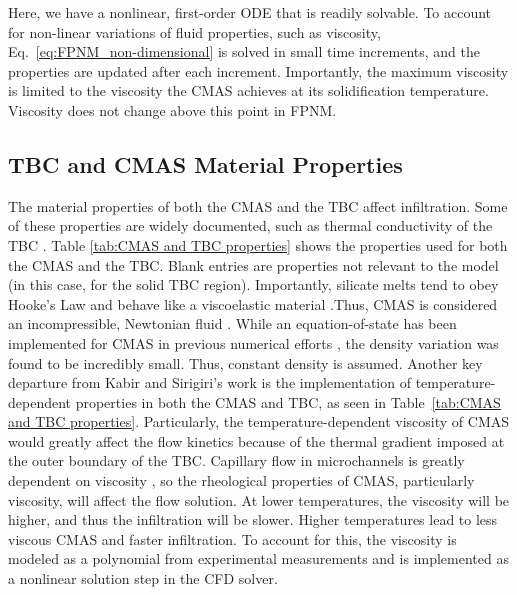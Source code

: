 \documentclass[%
 aip,
 amsmath,amssymb,
 reprint,%
floatfix]{revtex4-1}
\begin{document}
\noindent Here, we have a nonlinear, first-order ODE that is readily solvable. To account for non-linear variations of fluid properties, such as viscosity, Eq.~\ref{eq:FPNM_non-dimensional} is solved in small time increments, and the properties are updated after each increment. Importantly, the maximum viscosity is limited to the viscosity the CMAS achieves at its solidification temperature. Viscosity does not change above this point in FPNM.

\subsection{TBC and CMAS Material Properties}
\label{subsec:CMAS/TBCProp}
The material properties of both the CMAS and the TBC affect infiltration. Some of these properties are widely documented, such as thermal conductivity of the TBC \cite{Han2023}. Table \ref{tab:CMAS and TBC properties} shows the properties used for both the CMAS and the TBC. Blank entries are properties not relevant to the model (in this case, for the solid TBC region). Importantly, silicate melts tend to obey Hooke's Law and behave like a viscoelastic material \cite{Sharon1997}.Thus, CMAS is considered an incompressible, Newtonian fluid \cite{Naraparaju2017,Naraparaju2019, Sharon1997}.  While an equation-of-state has been implemented for CMAS in previous numerical efforts \cite{Sirigiri2018}, the density variation was found to be incredibly small. Thus, constant density is assumed. 
Another key departure from Kabir and Sirigiri's work \cite{Kabir, Sirigiri2018} is the implementation of temperature-dependent properties in both the CMAS and TBC, as seen in Table~\ref{tab:CMAS and TBC properties}. Particularly, the temperature-dependent viscosity of CMAS would greatly affect the flow kinetics because of the thermal gradient imposed at the outer boundary of the TBC. Capillary flow in microchannels is greatly dependent on viscosity \cite{Washburn19213}, so the rheological properties of CMAS, particularly viscosity, will affect the flow solution. At lower temperatures, the viscosity will be higher, and thus the infiltration will be slower. Higher temperatures lead to less viscous CMAS and faster infiltration. To account for this, the viscosity is modeled as a polynomial from experimental measurements \cite{Naraparaju2019} and is implemented as a nonlinear solution step in the CFD solver.
\end{document}
